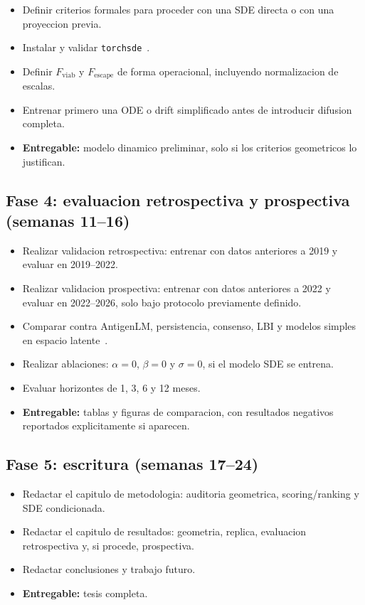 \documentclass[12pt,letterpaper]{article}
\newcommand{\Fviab}{F_{\mathrm{viab}}}
\newcommand{\Fescape}{F_{\mathrm{escape}}}
\begin{document}
\begin{itemize}[leftmargin=2em]
    \item Definir criterios formales para proceder con una SDE directa o con una proyeccion previa.
    \item Instalar y validar \texttt{torchsde}~\cite{li2020scalable}.
    \item Definir $\Fviab$ y $\Fescape$ de forma operacional, incluyendo normalizacion de escalas.
    \item Entrenar primero una ODE o drift simplificado antes de introducir difusion completa.
    \item \textbf{Entregable:} modelo dinamico preliminar, solo si los criterios geometricos lo justifican.
\end{itemize}

\subsection*{Fase 4: evaluacion retrospectiva y prospectiva \texorpdfstring{(semanas 11--16)}{(semanas 11--16)}}

\begin{itemize}[leftmargin=2em]
    \item Realizar validacion retrospectiva: entrenar con datos anteriores a 2019 y evaluar en 2019--2022.
    \item Realizar validacion prospectiva: entrenar con datos anteriores a 2022 y evaluar en 2022--2026, solo bajo protocolo previamente definido.
    \item Comparar contra AntigenLM, persistencia, consenso, LBI y modelos simples en espacio latente~\cite{neher2014predicting}.
    \item Realizar ablaciones: $\alpha=0$, $\beta=0$ y $\sigma=0$, si el modelo SDE se entrena.
    \item Evaluar horizontes de 1, 3, 6 y 12 meses.
    \item \textbf{Entregable:} tablas y figuras de comparacion, con resultados negativos reportados explicitamente si aparecen.
\end{itemize}

\subsection*{Fase 5: escritura \texorpdfstring{(semanas 17--24)}{(semanas 17--24)}}

\begin{itemize}[leftmargin=2em]
    \item Redactar el capitulo de metodologia: auditoria geometrica, scoring/ranking y SDE condicionada.
    \item Redactar el capitulo de resultados: geometria, replica, evaluacion retrospectiva y, si procede, prospectiva.
    \item Redactar conclusiones y trabajo futuro.
    \item \textbf{Entregable:} tesis completa.
\end{itemize}
\end{document}
